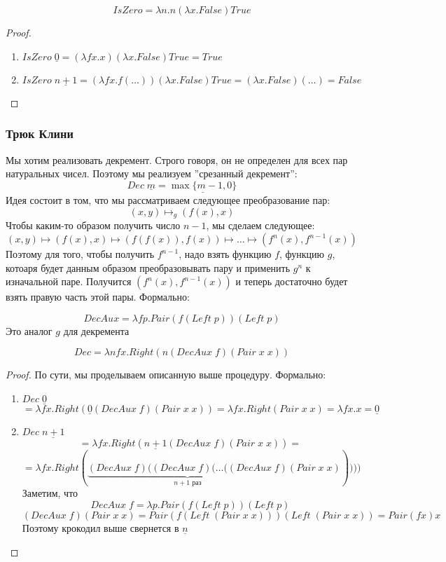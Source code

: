 \begin{definition}
    \[IsZero = \lambda n.n (\lambda x.False)True\]
\end{definition}
\begin{proof}\indent
    \begin{enumerate}
        \item \(IsZero\;\underline{0} = (\lambda fx.x)(\lambda x.False)True = True\)
        \item \(IsZero\;\underline{n + 1} = (\lambda fx.f(\dots))(\lambda x.False)True = (\lambda x.False)(\dots) = False\)
    \end{enumerate}
\end{proof}

\subsubsection{Трюк Клини}
Мы хотим реализовать декремент. Строго говоря, он не определен для всех пар натуральных чисел. Поэтому мы реализуем ''срезанный декремент'':
\[Dec\;\underline{m} = \underline{\max\{m - 1, 0\}}\]
Идея состоит в том, что мы рассматриваем следующее преобразование пар:
\[(x, y) \mapsto_g (f(x), x)\]
Чтобы каким-то образом получить число \(n - 1\), мы сделаем следующее:
\[(x, y) \mapsto (f(x), x) \mapsto (f(f(x)), f(x)) \mapsto \dots \mapsto (f^n(x), f^{n - 1}(x))\]
Поэтому для того, чтобы получить \(f^{n - 1}\), надо взять функцию \(f\), функцию \(g\), котоаря будет данным образом преобразовывать пару и применить \(g^n\) к изначальной паре. Получится \((f^n(x), f^{n - 1}(x))\) и теперь достаточно будет взять правую часть этой пары. Формально:

\begin{definition}
    \[DecAux = \lambda fp.Pair(f(Left\;p))(Left\;p)\]
    Это аналог \(g\) для декремента
\end{definition}
\begin{definition}
    \[Dec = \lambda nfx.Right(n(DecAux\;f)(Pair\;x\;x))\]
\end{definition}
\begin{proof}
    По сути, мы проделываем описанную выше процедуру. Формально:
    \begin{enumerate}
        \item \(Dec\;\underline{0}\) 
        \[= \lambda fx.Right(\underline{0}(DecAux\;f)(Pair\;x\;x)) = \lambda fx.Right(Pair\;x\;x) = \lambda fx.x = \underline{0}\]
        \item \(Dec\;\underline{n + 1}\)
        \[= \lambda fx.Right(\underline{n + 1}(DecAux\;f)(Pair\;x\;x)) = \]
        \[ = \lambda fx.Right(\underbrace{(DecAux\;f)((DecAux\;f)(\dots((DecAux\;f)}_{n + 1\text{ раз}}(Pair\;x\;x)))))\]
        Заметим, что 
        \[DecAux\;f = \lambda p.Pair(f(Left\;p))(Left\;p)\]
        \[(DecAux\;f)(Pair\;x\;x) = Pair(f(Left\;(Pair\;x\;x)))(Left\;(Pair\;x\;x)) = Pair(fx)x\]
        Поэтому крокодил выше свернется в \(\underline{n}\)
        
    \end{enumerate}
\end{proof}

